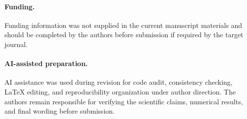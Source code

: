 \documentclass[11pt,a4paper]{article}
\theoremstyle{definition}
\numberwithin{equation}{section}   %
\begin{document}
\paragraph{Funding.}
Funding information was not supplied in the current manuscript materials and
should be completed by the authors before submission if required by the target
journal.

\paragraph{AI-assisted preparation.}
AI assistance was used during revision for code audit, consistency checking,
LaTeX editing, and reproducibility organization under author direction. The
authors remain responsible for verifying the scientific claims, numerical
results, and final wording before submission.



\end{document}
